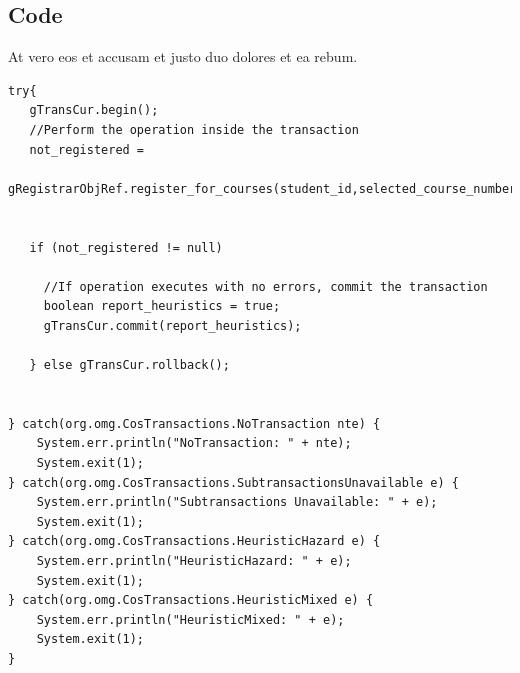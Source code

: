 \subsection{Code}

At vero eos et accusam et justo duo dolores et ea rebum.

\begin{lstlisting}[style=Java, caption=Implizite Transaktion \cite{tanenbaum2007verteilte}]
try{
   gTransCur.begin();
   //Perform the operation inside the transaction
   not_registered = 
       gRegistrarObjRef.register_for_courses(student_id,selected_course_numbers);


   if (not_registered != null)

     //If operation executes with no errors, commit the transaction
     boolean report_heuristics = true;
     gTransCur.commit(report_heuristics);

   } else gTransCur.rollback();


} catch(org.omg.CosTransactions.NoTransaction nte) {
    System.err.println("NoTransaction: " + nte);
    System.exit(1);
} catch(org.omg.CosTransactions.SubtransactionsUnavailable e) {
    System.err.println("Subtransactions Unavailable: " + e);
    System.exit(1);
} catch(org.omg.CosTransactions.HeuristicHazard e) {
    System.err.println("HeuristicHazard: " + e);
    System.exit(1);
} catch(org.omg.CosTransactions.HeuristicMixed e) {
    System.err.println("HeuristicMixed: " + e);
    System.exit(1);
}
\end{lstlisting}

